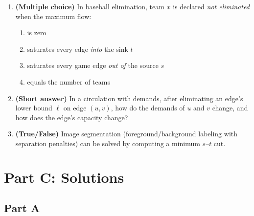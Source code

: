 \documentclass[11pt]{article}
\begin{document}
\begin{enumerate}[label=\textbf{B\arabic*.}, leftmargin=2.2em]
\item \textbf{(Multiple choice)} In baseball elimination, team $x$ is declared
\emph{not eliminated} when the maximum flow:
\begin{enumerate}[label=(\alph*)]
    \item is zero
    \item saturates every edge \emph{into} the sink $t$
    \item saturates every game edge \emph{out of} the source $s$
    \item equals the number of teams
\end{enumerate}

\item \textbf{(Short answer)} In a circulation with demands, after eliminating an
edge's lower bound $\ell$ on edge $(u,v)$, how do the demands of $u$ and $v$
change, and how does the edge's capacity change?

\item \textbf{(True/False)} Image segmentation (foreground/background labeling
with separation penalties) can be solved by computing a minimum $s$--$t$ cut.

\end{enumerate}

\newpage
\section*{Part C: Solutions}

\subsection*{Part A}
\end{document}
